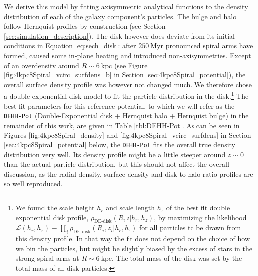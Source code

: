 \documentclass[iop,revtex4,numberedappendix,appendixfloats]{emulateapj}
\begin{document}
We derive this model by fitting axisymmetric analytical functions to the density distribution of each of the galaxy component's particles. The bulge and halo follow Hernquist profiles by construction (see Section \ref{sec:simulation_description}). The disk however does deviate from its initial conditions in Equation \eqref{eq:sech_disk}: after $250~\text{Myr}$ pronounced spiral arms have formed, caused some in-plane heating and introduced non-axisymmetries. Except of an overdensity around $R\sim6~\text{kpc}$ (see Figure \ref{fig:4kpc8Spiral_vcirc_surfdens_b} in Section \ref{sec:4kpc8Spiral_potential}), the overall surface density profile was however not changed much. We therefore chose a double exponential disk model to fit the particle distribution in the disk.\footnote{We found the scale height $h_r$ and scale length $h_z$ of the best fit double exponential disk profile, $\rho_\text{DE-disk}(R,z|h_r,h_z)$, by maximizing the likelihood $\mathscr{L}(h_r,h_z)\equiv\prod_i \rho_\text{DE-disk}(R_i,z_i|h_r,h_z)$ for all particles to be drawn from this density profile. In that way the fit does not depend on the choice of how we bin the particles, but might be slightly biased by the excess of stars in the strong spiral arms at $R\sim6~\text{kpc}$. The total mass of the disk was set by the total mass of all disk particles.} The best fit parameters for this reference potential, to which we will refer as the \texttt{DEHH-Pot} (Double-Exponential disk + Hernquist halo + Hernquist bulge) in the remainder of this work, are given in Table \ref{tbl:DEHH-Pot}. As can be seen in Figures \ref{fig:4kpc8Spiral_density} and \ref{fig:4kpc8Spiral_vcirc_surfdens} in Section \ref{sec:4kpc8Spiral_potential} below, the \texttt{DEHH-Pot} fits the overall true density distribution very well. Its density profile might be a little steeper around $z\sim 0$ than the actual particle distribution, but this should not affect the overall discussion, as the radial density, surface density and disk-to-halo ratio profiles are so well reproduced.
\end{document}
